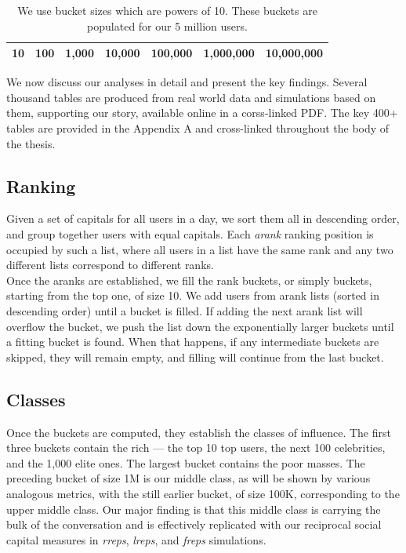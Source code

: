 \documentclass[10pt,oneside]{memoir}
\begin{document}
\begin{table}
\begin{tabular}{|ccccccc|}
\toprule
10 & 100 & 1,000 & 10,000 & 100,000 & 1,000,000 & 10,000,000 \\
\bottomrule
\end{tabular}
\label{table:bucket-sizes}
\caption{We use bucket sizes which are powers of 10.  These buckets are populated for our 5 million users.}
\end{table}

We now discuss our analyses in detail and present the key findings.  Several thousand tables are produced from real world data and simulations based on them, supporting our story, available online in a corss-linked PDF.  The key 400+ tables are provided in the Appendix A and cross-linked throughout the body of the thesis.


\subsection{Ranking}
\label{ranking}

Given a set of capitals for all users in a day, we sort them all in descending order, and group together users with equal capitals.  Each \emph{arank} ranking position is occupied by such a list, where all users in a list have the same rank and any two different lists correspond to different ranks. \\
Once the aranks are established, we fill the rank buckets, or simply buckets, starting from the top one, of size 10.  We add users from arank lists (sorted in descending order) until a bucket is filled.  If adding the next arank list will overflow the bucket, we push the list down the exponentially larger buckets until a fitting bucket is found.  When that happens, if any intermediate buckets are skipped, they will remain empty, and filling will continue from the last bucket.


\subsection{Classes}
\label{classes}

Once the buckets are computed, they establish the classes of influence.  The first three buckets contain the rich --- the top 10 top users, the next 100 celebrities, and the 1,000 elite ones.  The largest bucket contains the poor masses.  The preceding bucket of size 1M is our middle class, as will be shown by various analogous metrics, with the still earlier bucket, of size 100K, corresponding to the upper middle class. Our major finding is that this middle class is carrying the bulk of the conversation and is effectively replicated with our reciprocal social capital measures in \emph{rreps}, \emph{lreps}, and \emph{freps} simulations.
\end{document}
